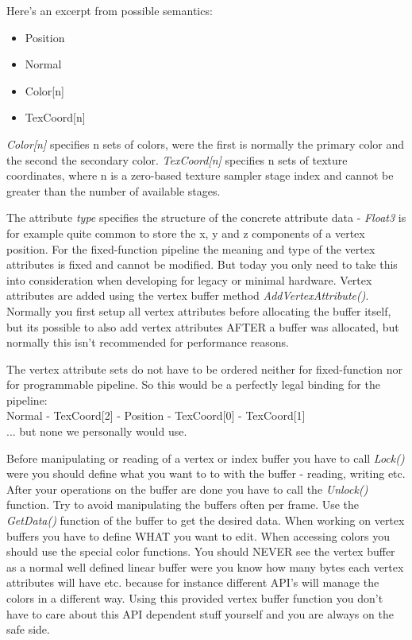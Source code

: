 Here's an excerpt from possible semantics:
\begin{itemize}
\item{Position}
\item{Normal}
\item{Color[n]}
\item{TexCoord[n]}
\end{itemize}

\emph{Color[n]} specifies n sets of colors, were the first is normally the primary color and the second the secondary color. \emph{TexCoord[n]} specifies n sets of texture coordinates, where n is a zero-based texture sampler stage index and cannot be greater than the number of available stages.

The attribute \emph{type} specifies the structure of the concrete attribute data - \emph{Float3} is for example quite common to store the x, y and z components of a vertex position. For the fixed-function pipeline the meaning and type of the vertex attributes is fixed and cannot be modified. But today you only need to take this into consideration when developing for legacy or minimal hardware. Vertex attributes are added using the vertex buffer method \emph{AddVertexAttribute()}. Normally you first setup all vertex attributes before allocating the buffer itself, but its possible to also add vertex attributes AFTER a buffer was allocated, but normally this isn't recommended for performance reasons.

The vertex attribute sets do not have to be ordered neither for fixed-function nor for programmable pipeline. So this would be a perfectly legal binding for the pipeline:\\
Normal - TexCoord[2] - Position - TexCoord[0] - TexCoord[1]\\
... but none we personally would use.

Before manipulating or reading of a vertex or index buffer you have to call \emph{Lock()} were you should define what you want to to with the buffer - reading, writing etc. After your operations on the buffer are done you have to call the \emph{Unlock()} function. Try to avoid manipulating the buffers often per frame. Use the \emph{GetData()} function of the buffer to get the desired data. When working on vertex buffers you have to define WHAT you want to edit. When accessing colors you should use the special color functions. You should NEVER see the vertex buffer as a normal well defined linear buffer were you know how many bytes each vertex attributes will have etc. because for instance different API's will manage the colors in a different way. Using this provided vertex buffer function you don't have to care about this API dependent stuff yourself and you are always on the safe side.



